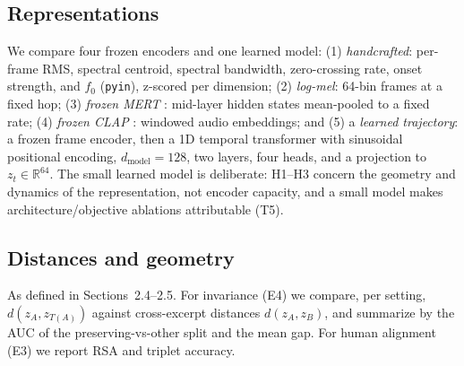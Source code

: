 \documentclass[11pt]{article}
\newcommand{\R}{\mathbb{R}}
\begin{document}
\subsection{Representations}
We compare four frozen encoders and one learned model: (1) \emph{handcrafted}:
per-frame RMS, spectral centroid, spectral bandwidth, zero-crossing rate, onset
strength, and $f_0$ (\texttt{pyin}), z-scored per dimension; (2) \emph{log-mel}:
64-bin frames at a fixed hop; (3) \emph{frozen MERT} \citep{li2024mert}: mid-layer
hidden states mean-pooled to a fixed rate; (4) \emph{frozen CLAP}
\citep{elizalde2023clap,wu2023laionclap}: windowed audio embeddings; and (5) a
\emph{learned trajectory}: a frozen frame encoder, then a 1D temporal transformer
\citep{vaswani2017attention} with sinusoidal positional encoding,
$d_{\text{model}}=128$, two layers, four heads, and a projection to
$z_t\in\R^{64}$. The small learned model is deliberate: H1--H3 concern the geometry
and dynamics of the representation, not encoder capacity, and a small model makes
architecture/objective ablations attributable (T5).

\subsection{Distances and geometry}
As defined in Sections~2.4--2.5. For invariance (E4) we compare,
per setting, $d(z_A,z_{T(A)})$ against cross-excerpt distances $d(z_A,z_B)$, and
summarize by the AUC of the preserving-vs-other split and the mean gap. For human
alignment (E3) we report RSA and triplet accuracy.
\end{document}
